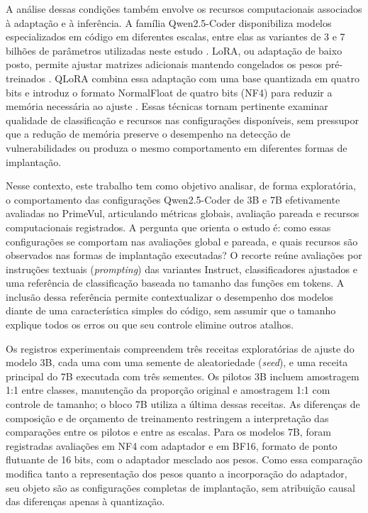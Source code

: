 A análise dessas condições também envolve os recursos computacionais associados à adaptação e à inferência. A família Qwen2.5-Coder disponibiliza modelos especializados em código em diferentes escalas, entre elas as variantes de 3 e 7 bilhões de parâmetros utilizadas neste estudo \cite{hui2024qwen}. LoRA, ou adaptação de baixo posto, permite ajustar matrizes adicionais mantendo congelados os pesos pré-treinados \cite{hu2021lora}. QLoRA combina essa adaptação com uma base quantizada em quatro bits e introduz o formato NormalFloat de quatro bits (NF4) para reduzir a memória necessária ao ajuste \cite{dettmers2023qlora}. Essas técnicas tornam pertinente examinar qualidade de classificação e recursos nas configurações disponíveis, sem pressupor que a redução de memória preserve o desempenho na detecção de vulnerabilidades ou produza o mesmo comportamento em diferentes formas de implantação.

Nesse contexto, este trabalho tem como objetivo analisar, de forma exploratória, o comportamento das configurações Qwen2.5-Coder de 3B e 7B efetivamente avaliadas no PrimeVul, articulando métricas globais, avaliação pareada e recursos computacionais registrados. A pergunta que orienta o estudo é: como essas configurações se comportam nas avaliações global e pareada, e quais recursos são observados nas formas de implantação executadas? O recorte reúne avaliações por instruções textuais (\textit{prompting}) das variantes Instruct, classificadores ajustados e uma referência de classificação baseada no tamanho das funções em tokens. A inclusão dessa referência permite contextualizar o desempenho dos modelos diante de uma característica simples do código, sem assumir que o tamanho explique todos os erros ou que seu controle elimine outros atalhos.

Os registros experimentais compreendem três receitas exploratórias de ajuste do modelo 3B, cada uma com uma semente de aleatoriedade (\textit{seed}), e uma receita principal do 7B executada com três sementes. Os pilotos 3B incluem amostragem 1:1 entre classes, manutenção da proporção original e amostragem 1:1 com controle de tamanho; o bloco 7B utiliza a última dessas receitas. As diferenças de composição e de orçamento de treinamento restringem a interpretação das comparações entre os pilotos e entre as escalas. Para os modelos 7B, foram registradas avaliações em NF4 com adaptador e em BF16, formato de ponto flutuante de 16 bits, com o adaptador mesclado aos pesos. Como essa comparação modifica tanto a representação dos pesos quanto a incorporação do adaptador, seu objeto são as configurações completas de implantação, sem atribuição causal das diferenças apenas à quantização.

